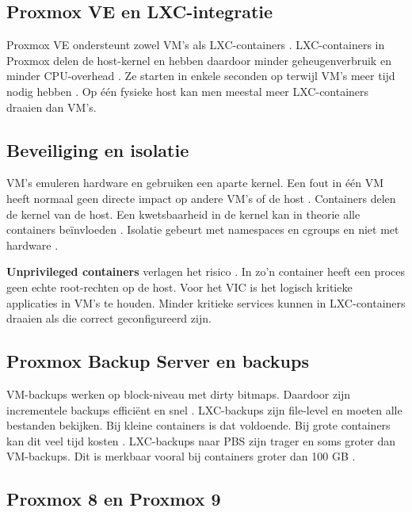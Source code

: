 \subsection{Proxmox VE en LXC-integratie}

Proxmox VE ondersteunt zowel VM's als LXC-containers \autocite{ProxmoxDocs}. LXC-containers in Proxmox delen de host-kernel en hebben daardoor minder geheugenverbruik en minder CPU-overhead \autocite{ReadySpace2023}. Ze starten in enkele seconden op terwijl VM's meer tijd nodig hebben \autocite{TechOpt2025}. Op één fysieke host kan men meestal meer LXC-containers draaien dan VM's.

\subsection{Beveiliging en isolatie}

VM's emuleren hardware en gebruiken een aparte kernel. Een fout in één VM heeft normaal geen directe impact op andere VM's of de host \autocite{ArXiv2021Isolation}. Containers delen de kernel van de host. Een kwetsbaarheid in de kernel kan in theorie alle containers beïnvloeden \autocite{Aquasec2024}. Isolatie gebeurt met namespaces en cgroups en niet met hardware \autocite{Infosec2021}.

\textbf{Unprivileged containers} verlagen het risico \autocite{SecurityLabs2023}. In zo'n container heeft een proces geen echte root-rechten op de host. Voor het VIC is het logisch kritieke applicaties in VM's te houden. Minder kritieke services kunnen in LXC-containers draaien als die correct geconfigureerd zijn.

\subsection{Proxmox Backup Server en backups}

VM-backups werken op block-niveau met dirty bitmaps. Daardoor zijn incrementele backups efficiënt en snel \autocite{ItNotes2020}. LXC-backups zijn file-level en moeten alle bestanden bekijken. Bij kleine containers is dat voldoende. Bij grote containers kan dit veel tijd kosten \autocite{ProxmoxForum2021, ProxmoxForum2024}. LXC-backups naar PBS zijn trager en soms groter dan VM-backups. Dit is merkbaar vooral bij containers groter dan 100 GB \autocite{ProxmoxForum2025}.

\subsection{Proxmox 8 en Proxmox 9}

